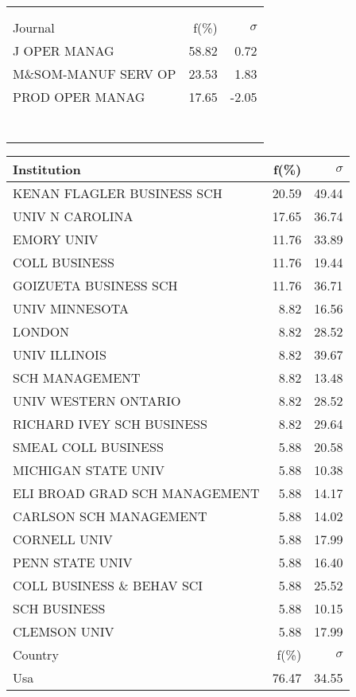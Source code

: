 \documentclass[a4paper,11pt]{report}
\begin{document}
\begin{landscape}
\begin{table}[!ht]
{\begin{tabular}{|l r  r|}
 &  & \\
 &  & \\
\hline
\hline
Journal & f(\%) & $\sigma$\\
\hline
J OPER MANAG & 58.82 & 0.72\\
M\&SOM-MANUF SERV OP & 23.53 & 1.83\\
PROD OPER MANAG & 17.65 & -2.05\\
 &  & \\
 &  & \\
 &  & \\
 &  & \\
 &  & \\
 &  & \\
 &  & \\
\hline
\end{tabular}
}
{\scriptsize\begin{tabular}{|l r r|}
\hline
Institution & f(\%) & $\sigma$\\
\hline
KENAN FLAGLER BUSINESS SCH & 20.59 & 49.44\\
UNIV N CAROLINA & 17.65 & 36.74\\
EMORY UNIV & 11.76 & 33.89\\
COLL BUSINESS & 11.76 & 19.44\\
GOIZUETA BUSINESS SCH & 11.76 & 36.71\\
UNIV MINNESOTA & 8.82 & 16.56\\
LONDON & 8.82 & 28.52\\
UNIV ILLINOIS & 8.82 & 39.67\\
SCH MANAGEMENT & 8.82 & 13.48\\
UNIV WESTERN ONTARIO & 8.82 & 28.52\\
RICHARD IVEY SCH BUSINESS & 8.82 & 29.64\\
SMEAL COLL BUSINESS & 5.88 & 20.58\\
MICHIGAN STATE UNIV & 5.88 & 10.38\\
ELI BROAD GRAD SCH MANAGEMENT & 5.88 & 14.17\\
CARLSON SCH MANAGEMENT & 5.88 & 14.02\\
CORNELL UNIV & 5.88 & 17.99\\
PENN STATE UNIV & 5.88 & 16.40\\
COLL BUSINESS \& BEHAV SCI & 5.88 & 25.52\\
SCH BUSINESS & 5.88 & 10.15\\
CLEMSON UNIV & 5.88 & 17.99\\
\hline
\hline
Country & f(\%) & $\sigma$\\
\hline
Usa & 76.47 & 34.55\\

\end{tabular}}
\end{table}
\end{landscape}
\end{document}
